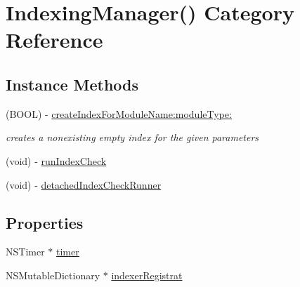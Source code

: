 \hypertarget{category_indexing_manager_07_08}{\section{Indexing\-Manager() Category Reference}
\label{category_indexing_manager_07_08}
}
\subsection*{Instance Methods}
\begin{DoxyCompactItemize}
\item 
(B\-O\-O\-L) -\/ \hyperlink{category_indexing_manager_07_08_a9168b0c145bd6bd2d451dab7f0f22c97}{create\-Index\-For\-Module\-Name\-:module\-Type\-:}
\begin{DoxyCompactList}\small\item\em creates a nonexisting empty index for the given parameters \end{DoxyCompactList}\item 
(void) -\/ \hyperlink{category_indexing_manager_07_08_ac631b13b40180298f467f1dbcf2c1f7e}{run\-Index\-Check}
\item 
(void) -\/ \hyperlink{category_indexing_manager_07_08_a2fa5bf410879de7980dd9c7e60e86dd6}{detached\-Index\-Check\-Runner}
\end{DoxyCompactItemize}
\subsection*{Properties}
\begin{DoxyCompactItemize}
\item 
N\-S\-Timer $\ast$ \hyperlink{category_indexing_manager_07_08_a49efd1a3e05e38497c176a4e11fdbaab}{timer}
\item 
N\-S\-Mutable\-Dictionary $\ast$ \hyperlink{category_indexing_manager_07_08_a9a3484f0fcbdee9b2555cece4280811b}{indexer\-Registrat}
\end{DoxyCompactItemize}


